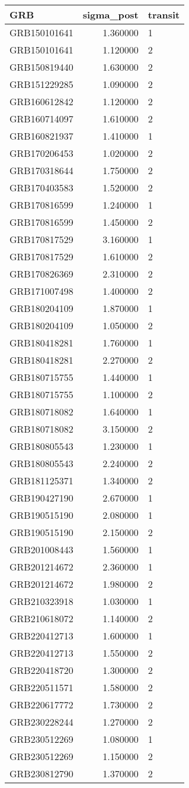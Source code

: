 \begin{tabular}{lrl}
\toprule
GRB & sigma_post & transit \\
\midrule
GRB150101641 & 1.360000 & 1 \\
GRB150101641 & 1.120000 & 2 \\
GRB150819440 & 1.630000 & 2 \\
GRB151229285 & 1.090000 & 2 \\
GRB160612842 & 1.120000 & 2 \\
GRB160714097 & 1.610000 & 2 \\
GRB160821937 & 1.410000 & 1 \\
GRB170206453 & 1.020000 & 2 \\
GRB170318644 & 1.750000 & 2 \\
GRB170403583 & 1.520000 & 2 \\
GRB170816599 & 1.240000 & 1 \\
GRB170816599 & 1.450000 & 2 \\
GRB170817529 & 3.160000 & 1 \\
GRB170817529 & 1.610000 & 2 \\
GRB170826369 & 2.310000 & 2 \\
GRB171007498 & 1.400000 & 2 \\
GRB180204109 & 1.870000 & 1 \\
GRB180204109 & 1.050000 & 2 \\
GRB180418281 & 1.760000 & 1 \\
GRB180418281 & 2.270000 & 2 \\
GRB180715755 & 1.440000 & 1 \\
GRB180715755 & 1.100000 & 2 \\
GRB180718082 & 1.640000 & 1 \\
GRB180718082 & 3.150000 & 2 \\
GRB180805543 & 1.230000 & 1 \\
GRB180805543 & 2.240000 & 2 \\
GRB181125371 & 1.340000 & 2 \\
GRB190427190 & 2.670000 & 1 \\
GRB190515190 & 2.080000 & 1 \\
GRB190515190 & 2.150000 & 2 \\
GRB201008443 & 1.560000 & 1 \\
GRB201214672 & 2.360000 & 1 \\
GRB201214672 & 1.980000 & 2 \\
GRB210323918 & 1.030000 & 1 \\
GRB210618072 & 1.140000 & 2 \\
GRB220412713 & 1.600000 & 1 \\
GRB220412713 & 1.550000 & 2 \\
GRB220418720 & 1.300000 & 2 \\
GRB220511571 & 1.580000 & 2 \\
GRB220617772 & 1.730000 & 2 \\
GRB230228244 & 1.270000 & 2 \\
GRB230512269 & 1.080000 & 1 \\
GRB230512269 & 1.150000 & 2 \\
GRB230812790 & 1.370000 & 2 \\
\bottomrule
\end{tabular}
